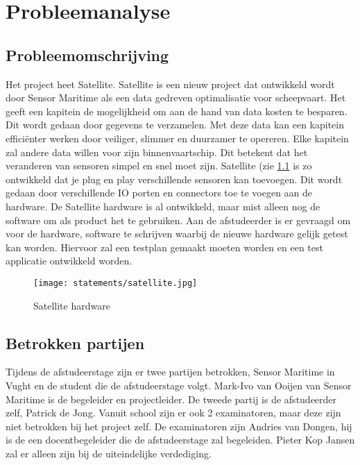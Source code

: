 \chapter{Probleemanalyse}

\section{Probleemomschrijving}
Het project heet Satellite. Satellite is een nieuw project dat ontwikkeld wordt door Sensor Maritime als een data gedreven optimalisatie voor scheepvaart. Het geeft een kapitein de mogelijkheid om aan de hand van data kosten te besparen. Dit wordt gedaan door gegevens te verzamelen. Met deze data kan een kapitein efficiënter werken door veiliger, slimmer en duurzamer te opereren. Elke kapitein zal andere data willen voor zijn binnenvaartschip. Dit betekent dat het veranderen van sensoren simpel en snel moet zijn. Satellite (zie \ref{fig:shw} is zo ontwikkeld dat je plug en play verschillende sensoren kan toevoegen. Dit wordt gedaan door verschillende IO porten en connectors toe te voegen aan de hardware. De Satellite hardware is al ontwikkeld, maar mist alleen nog de software om als product het te gebruiken. Aan de afstudeerder is er gevraagd om voor de hardware, software te schrijven waarbij de nieuwe hardware gelijk getest kan worden. Hiervoor zal een testplan gemaakt moeten worden en een test applicatie ontwikkeld worden.
\begin{figure}[h!]
	\begin{centering}
		\caption{Satellite hardware}
	\texttt{[image: statements/satellite.jpg]}

	\label{fig:shw}
	\end{centering}
\end{figure}
\section{Betrokken partijen}
Tijdens de afstudeerstage zijn er twee partijen betrokken, Sensor Maritime in Vught en de student die de afstudeerstage volgt. Mark-Ivo van Ooijen van Sensor Maritime is de begeleider en projectleider. De tweede partij is de afstudeerder zelf, Patrick de Jong. Vanuit school zijn er ook 2 examinatoren, maar deze zijn niet betrokken bij het project zelf. De examinatoren zijn Andries van Dongen, hij is de een docentbegeleider die de afstudeerstage zal begeleiden. Pieter Kop Jansen zal er alleen zijn bij de uiteindelijke verdediging.

